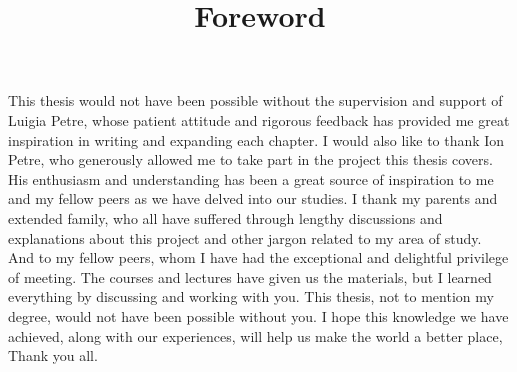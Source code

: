 \title{Foreword}

This thesis would not have been possible without the supervision and support of Luigia Petre, whose patient attitude and rigorous feedback has provided me great inspiration in writing and expanding each chapter. I would also like to thank Ion Petre, who generously allowed me to take part in the project this thesis covers. His enthusiasm and understanding has been a great source of inspiration to me and my fellow peers as we have delved into our studies. I thank my parents and extended family, who all have suffered through lengthy discussions and explanations about this project and other jargon related to my area of study. And to my fellow peers, whom I have had the exceptional and delightful privilege of meeting. The courses and lectures have given us the materials, but I learned everything by discussing and working with you. This thesis, not to mention my degree, would not have been possible without you. I hope this knowledge we have achieved, along with our experiences, will help us make the world a better place, Thank you all.